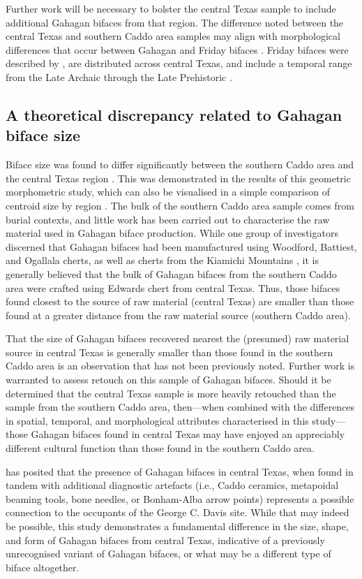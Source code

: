 \documentclass[review]{elsarticle}
\begin{document}
Further work will be necessary to bolster the central Texas sample to include additional Gahagan bifaces from that region. The difference noted between the central Texas and southern Caddo area samples may align with morphological differences that occur between Gahagan and Friday bifaces \cite[254-255]{RN20871}. Friday bifaces were described by \citet{RN20872}, are distributed across central Texas, and include a temporal range from the Late Archaic through the Late Prehistoric \citep[254]{RN20871}. 

\subsection*{A theoretical discrepancy related to Gahagan biface size}

Biface size was found to differ significantly between the southern Caddo area and the central Texas region \citep{RN20850}. This was demonstrated in the results of this geometric morphometric study, which can also be visualised in a simple comparison of centroid size by region \citep{RN20850}. The bulk of the southern Caddo area sample comes from burial contexts, and little work has been carried out to characterise the raw material used in Gahagan biface production. While one group of investigators discerned that Gahagan bifaces had been manufactured using Woodford, Battiest, and Ogallala cherts, as well as cherts from the Kiamichi Mountains \citep{RN1001}, it is generally believed that the bulk of Gahagan bifaces from the southern Caddo area were crafted using Edwards chert from central Texas. Thus, those bifaces found closest to the source of raw material (central Texas) are smaller than those found at a greater distance from the raw material source (southern Caddo area).

That the size of Gahagan bifaces recovered nearest the (presumed) raw material source in central Texas is generally smaller than those found in the southern Caddo area is an observation that has not been previously noted. Further work is warranted to assess retouch on this sample of Gahagan bifaces. Should it be determined that the central Texas sample is more heavily retouched than the sample from the southern Caddo area, then---when combined with the differences in spatial, temporal, and morphological attributes characterised in this study---those Gahagan bifaces found in central Texas may have enjoyed an appreciably different cultural function than those found in the southern Caddo area.

\citet{RN4924} has posited that the presence of Gahagan bifaces in central Texas, when found in tandem with additional diagnostic artefacts (i.e., Caddo ceramics, metapoidal beaming tools, bone needles, or Bonham-Alba arrow points) represents a possible connection to the occupants of the George C. Davis site. While that may indeed be possible, this study demonstrates a fundamental difference in the size, shape, and form of Gahagan bifaces from central Texas, indicative of a previously unrecognised variant of Gahagan bifaces, or what may be a different type of biface altogether.
\end{document}
